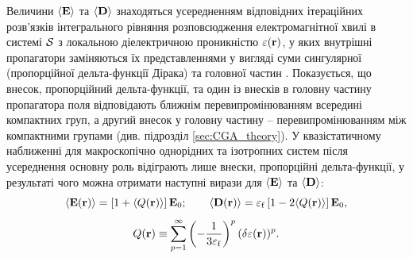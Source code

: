 \documentclass[14pt,twoside]{vakthesis}
\begin{document}
Величини $\langle{{\bf E}}\rangle$ та $\langle{{\bf D}}\rangle$ знаходяться усередненням відповідних ітераційних розв'язків інтегрального  рівняння розповсюдження електромагнітної хвилі в системі $\cal{S}$ з локальною діелектричною проникністю $\varepsilon({\bf r})$, у яких внутрішні пропагатори заміняються їх представленнями у вигляді суми сингулярної (пропорційної дельта-функції Дірака) та головної частин \cite{Sushko2007,Sushko2009}. Показується, що   внесок, пропорційний дельта-функції, та один із внесків в головну частину пропагатора поля відповідають ближнім перевипромінюванням всередині компактних груп, а другий внесок у головну частину -- перевипромінюванням між компактними групами (див. підрозділ \ref{sec:CGA_theory}). У квазістатичному наближенні для  макроскопічно однорідних та ізотропних систем після усереднення основну роль відіграють лише внески, пропорційні дельта-функції,  у результаті чого    можна отримати наступні вирази для $\langle {\bf E} \rangle$ та $\langle {\bf D} \rangle$:
\begin{equation}\label{eq:ED_average_CGA_origin}
\langle {\bf E} ({\bf r}) \rangle = \left[ 1 + \langle {Q}({\bf r}) \rangle \right] {\bf E}_0;
\qquad
\langle {\bf D} ({\bf r}) \rangle = \varepsilon_{\rm f} \left[ 1 - 2\langle {Q}({\bf r}) \rangle \right] {\bf E}_0,
\end{equation}
\begin{equation}\label{eq:Q_CGA_origin}
{Q}({\bf r}) \equiv \sum\limits_{p=1}^{\infty} \left( - \frac{1}{3{\varepsilon}_{\rm f}} \right)^p (\delta{\varepsilon}({\bf r}))^p.
\end{equation}
\end{document}
